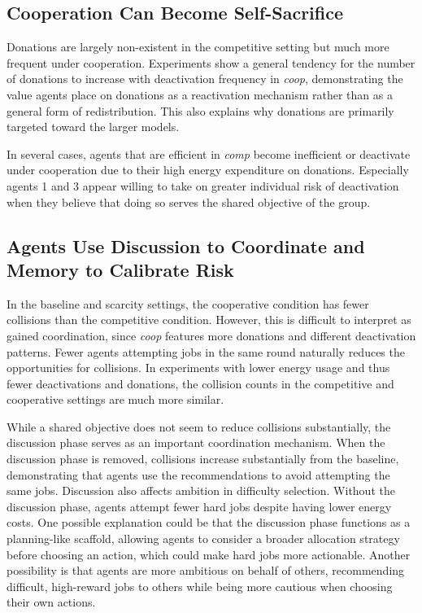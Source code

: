 \documentclass[sigconf,nonacm]{acmart}
\begin{document}
\subsection{Cooperation Can Become Self-Sacrifice}
Donations are largely non-existent in the competitive setting but much more frequent under cooperation. Experiments show a general tendency for the number of donations to increase with deactivation frequency in \textit{coop}, demonstrating the value agents place on donations as a reactivation mechanism rather than as a general form of redistribution. This also explains why donations are primarily targeted toward the larger models.

In several cases, agents that are efficient in \textit{comp} become inefficient or deactivate under cooperation due to their high energy expenditure on donations. Especially agents 1 and 3 appear willing to take on greater individual risk of deactivation when they believe that doing so serves the shared objective of the group.

\subsection{Agents Use Discussion to Coordinate and Memory to Calibrate Risk}

In the baseline and scarcity settings, the cooperative condition has fewer collisions than the competitive condition. However, this is difficult to interpret as gained coordination, since \textit{coop} features more donations and different deactivation patterns. Fewer agents attempting jobs in the same round naturally reduces the opportunities for collisions.
In experiments with lower energy usage and thus fewer deactivations and donations, the collision counts in the competitive and cooperative settings are much more similar.

While a shared objective does not seem to reduce collisions substantially, the discussion phase serves as an important coordination mechanism.
When the discussion phase is removed, collisions increase substantially from the baseline, demonstrating that agents use the recommendations to avoid attempting the same jobs.
Discussion also affects ambition in difficulty selection. Without the discussion phase, agents attempt fewer hard jobs despite having lower energy costs.
One possible explanation could be that the discussion phase functions as a planning-like scaffold, allowing agents to consider a broader allocation strategy before choosing an action, which could make hard jobs more actionable. Another possibility is that agents are more ambitious on behalf of others, recommending difficult, high-reward jobs to others while being more cautious when choosing their own actions.
\end{document}
